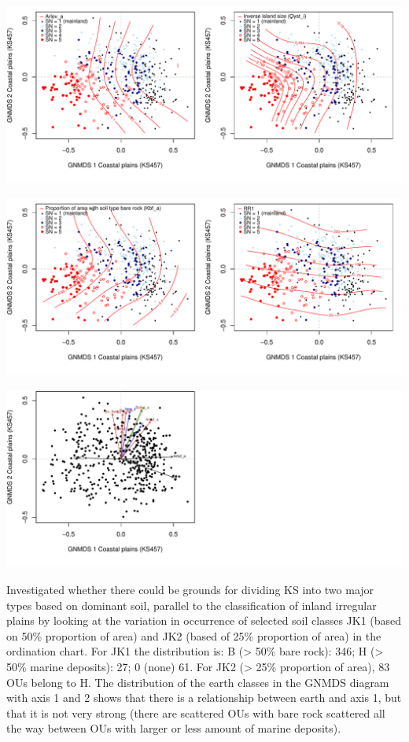 \documentclass[]{article}
\begin{document}
\includegraphics{Landscape_analysis_example_4_files/figure-latex/unnamed-chunk-12-1.pdf}

\includegraphics{Landscape_analysis_example_4_files/figure-latex/unnamed-chunk-13-1.pdf}

\includegraphics{Landscape_analysis_example_4_files/figure-latex/unnamed-chunk-14-1.pdf}

Investigated whether there could be grounds for dividing KS into two
major types based on dominant soil, parallel to the classification of
inland irregular plains by looking at the variation in occurrence of
selected soil classes JK1 (based on 50\% proportion of area) and JK2
(based of 25\% proportion of area) in the ordination chart. For JK1 the
distribution is: B (\textgreater{} 50\% bare rock): 346; H
(\textgreater{} 50\% marine deposits): 27; 0 (none) 61. For JK2
(\textgreater{} 25\% proportion of area), 83 OUs belong to H. The
distribution of the earth classes in the GNMDS diagram with axis 1 and 2
shows that there is a relationship between earth and axis 1, but that it
is not very strong (there are scattered OUs with bare rock scattered all
the way between OUs with larger or less amount of marine deposits).
\end{document}
